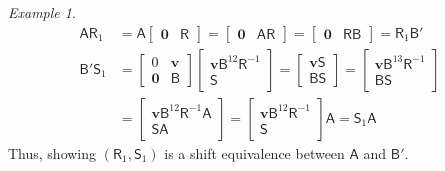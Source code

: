 \documentclass[12pt]{amsbook}%
\theoremstyle{defin}
\theoremstyle{remark}
\newtheorem{examp}[theor]{Example}
\numberwithin{equation}{chapter}
\numberwithin{theor}{section}
\begin{document}
\begin{examp}
\begin{align*}
\mathsf{A} \mathsf{R}_1 &= \mathsf{A} \begin{bmatrix} \mathbf{0} & \mathsf{R} \end{bmatrix}  = \begin{bmatrix} \mathbf{0} & \mathsf{A}\mathsf{R} \end{bmatrix}  = \begin{bmatrix} \mathbf{0} & \mathsf{R} \mathsf{B} \end{bmatrix}  = \mathsf{R}_1 \mathsf{B}' \\
\mathsf{B}' \mathsf{S}_1 &= \begin{bmatrix} 0 & \mathbf{v} \\ \mathbf{0} & \mathsf{B} \end{bmatrix}  \begin{bmatrix} \mathbf{v} \mathsf{B}^{12} \mathsf{R}^{-1}\\ \mathsf{S} \end{bmatrix} = \begin{bmatrix} \mathbf{v} \mathsf{S} \\ \mathsf{B} \mathsf{S} \end{bmatrix} = \begin{bmatrix} \mathbf{v} \mathsf{B}^{13} \mathsf{R}^{-1} \\ \mathsf{B} \mathsf{S} \end{bmatrix} \\
&=\begin{bmatrix} \mathbf{v} \mathsf{B}^{12} \mathsf{R}^{-1} \mathsf{A}\\ \mathsf{S} \mathsf{A} \end{bmatrix}=\begin{bmatrix} \mathbf{v} \mathsf{B}^{12} \mathsf{R}^{-1}\\ \mathsf{S} \end{bmatrix}\mathsf{A}=  \mathsf{S}_1 \mathsf{A}
\end{align*}
Thus, showing $(\mathsf{R}_1, \mathsf{S}_1)$ is a shift equivalence between $\mathsf{A}$ and $\mathsf{B}'$.  


\end{examp}
\end{document}
